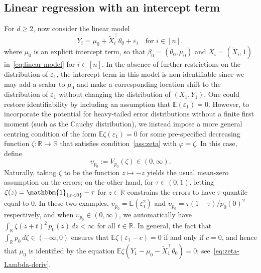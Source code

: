 \documentclass[a4paper]{article}
\newcommand{\R}{\mathbb{R}}
\newcommand{\E}{\mathbb{E}}
\newcommand{\Ind}{\mathbbm{1}}
\theoremstyle{definition}
\begin{document}
\subsection{Linear regression with an intercept term}
\label{subsec:linreg-intercept}
For $d \geq 2$, now consider the linear model
\begin{equation}
\label{eq:linear-model-intercept}
Y_i = \mu_0 + \tilde{X}_i^\top\theta_0 + \varepsilon_i \quad\text{for }i \in [n],
\end{equation}
where $\mu_0$ is an explicit intercept term, so that $\beta_0 = (\theta_0,\mu_0)$ and $X_i = (\tilde{X}_i,1)$ in~\eqref{eq:linear-model} for $i \in [n]$.  In the absence of further restrictions on the distribution of $\varepsilon_1$, the intercept term in this model is non-identifiable since we may add a scalar to $\mu_0$ and make a corresponding location shift to the distribution of $\varepsilon_1$ without changing the distribution of $(X_1,Y_1)$. One could restore identifiability by including an assumption that $\E(\varepsilon_1) = 0$. However, to incorporate the potential for heavy-tailed error distributions without a finite first moment (such as the Cauchy distribution), we instead impose a more general centring condition of the form $\E\zeta(\varepsilon_1) = 0$ for some pre-specified decreasing function $\zeta \colon \R \to \R$ that satisfies condition~\ref{ass:zeta} with $\varphi = \zeta$. In this case, define
\[
\upsilon_{p_0} := V_{p_0}(\zeta) \in (0,\infty).
\]
Naturally, taking $\zeta$ to be the function $z \mapsto -z$ yields the usual mean-zero assumption on the errors; on the other hand, for $\tau \in (0,1)$, letting $\zeta(z) = \Ind_{\{z < 0\}} - \tau$ for $z \in \R$ constrains the errors to have $\tau$-quantile equal to 0. In these two examples, $\upsilon_{p_0} = \E(\varepsilon_1^2)$ and $\upsilon_{p_0} = \tau(1 - \tau)/p_0(0)^2$ 
respectively, and when $\upsilon_{p_0} \in (0,\infty)$, we automatically have $\int_\R \zeta(z + t)^2\,p_0(z)\,dz < \infty$ for all $t \in \R$.
In general, the fact that $\int_\R p_0\,d\zeta \in (-\infty,0)$ ensures that $\E\zeta(\varepsilon_1 - c) = 0$ if and only if $c = 0$, and hence that $\mu_0$ is
identified by the equation $\E\zeta(Y_1 - \mu_0 - \tilde{X}_1^\top\theta_0) = 0$; see~\eqref{eq:zeta-Lambda-deriv}. 
\end{document}
